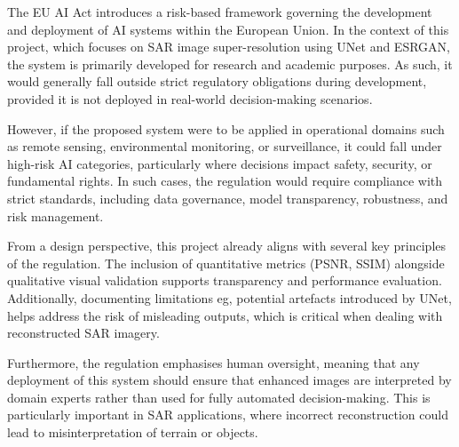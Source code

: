 \documentclass[conference]{IEEEtran}
\begin{document}
The EU AI Act\cite{eu_ai_act_2024} introduces a risk-based framework governing the development and deployment of AI systems within the European Union. In the context of this project, which focuses on SAR image super-resolution using UNet and ESRGAN, the system is primarily developed for research and academic purposes. As such, it would generally fall outside strict regulatory obligations during development, provided it is not deployed in real-world decision-making scenarios.

However, if the proposed system were to be applied in operational domains such as remote sensing, environmental monitoring, or surveillance, it could fall under high-risk AI categories, particularly where decisions impact safety, security, or fundamental rights. In such cases, the regulation would require compliance with strict standards, including data governance, model transparency, robustness, and risk management.

From a design perspective, this project already aligns with several key principles of the regulation. The inclusion of quantitative metrics (PSNR, SSIM) alongside qualitative visual validation supports transparency and performance evaluation. Additionally, documenting limitations eg, potential artefacts introduced by UNet, helps address the risk of misleading outputs, which is critical when dealing with reconstructed SAR imagery.

Furthermore, the regulation emphasises human oversight, meaning that any deployment of this system should ensure that enhanced images are interpreted by domain experts rather than used for fully automated decision-making. This is particularly important in SAR applications, where incorrect reconstruction could lead to misinterpretation of terrain or objects.
\end{document}
